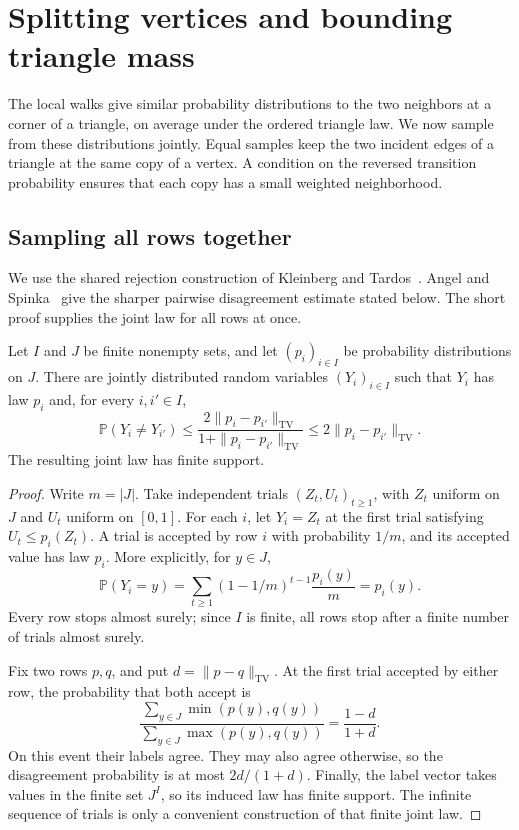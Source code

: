 \section{Splitting vertices and bounding triangle mass}
\label{sec:splitting}

The local walks give similar probability distributions to the two
neighbors at a corner of a triangle, on average under the ordered
triangle law. We now sample from these distributions jointly.
Equal samples keep the two incident edges of a triangle at the same copy
of a vertex. A condition on the reversed transition probability ensures
that each copy has a small weighted neighborhood.

\subsection{Sampling all rows together}

We use the shared rejection construction of Kleinberg and
Tardos~\cite[Section~3, Lemmas~3.1 and~3.2]{KleinbergTardos2002}.
Angel and Spinka~\cite[Theorem~2 and Section~2.1]{AngelSpinka2021}
give the sharper pairwise disagreement estimate stated below.
The short proof supplies the joint law for all rows at once.

\begin{lemma}\label{lem:shared-rejection}
Let $I$ and $J$ be finite nonempty sets, and let $(p_i)_{i\in I}$ be
probability distributions on $J$. There are jointly distributed random
variables $(Y_i)_{i\in I}$ such that $Y_i$ has law $p_i$ and, for every
$i,i'\in I$,
\[
 \mathbb P(Y_i\ne Y_{i'})
 \le \frac{2\|p_i-p_{i'}\|_{\mathrm{TV}}}
 {1+\|p_i-p_{i'}\|_{\mathrm{TV}}}
 \le 2\|p_i-p_{i'}\|_{\mathrm{TV}}.
\]
The resulting joint law has finite support.
\end{lemma}

\begin{proof}
Write $m=|J|$. Take independent trials $(Z_t,U_t)_{t\ge1}$, with $Z_t$
uniform on $J$ and $U_t$ uniform on $[0,1]$. For each $i$, let $Y_i=Z_t$
at the first trial satisfying $U_t\le p_i(Z_t)$. A trial is accepted
by row $i$ with probability $1/m$, and its accepted value has law $p_i$.
More explicitly, for $y\in J$,
\[
 \mathbb P(Y_i=y)
 =\sum_{t\ge1}(1-1/m)^{t-1}\frac{p_i(y)}m=p_i(y).
\]
Every row stops almost surely; since $I$ is finite, all rows stop after
a finite number of trials almost surely.

Fix two rows $p,q$, and put $d=\|p-q\|_{\mathrm{TV}}$. At the first
trial accepted by either row, the probability that both accept is
\[
 \frac{\sum_{y\in J}\min(p(y),q(y))}
 {\sum_{y\in J}\max(p(y),q(y))}
 =\frac{1-d}{1+d}.
\]
On this event their labels agree. They may also agree otherwise, so
the disagreement probability is at most $2d/(1+d)$. Finally, the label
vector takes values in the finite set $J^I$, so its induced law has
finite support. The infinite sequence of trials is only a convenient
construction of that finite joint law.
\end{proof}

